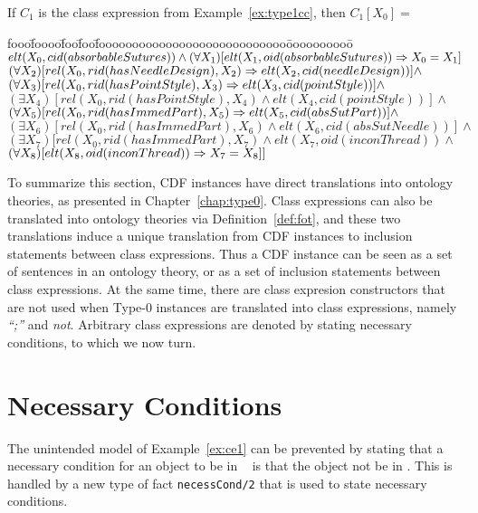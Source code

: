 \begin{example} \rm
If $C_1$ is the class expression from Example~\ref{ex:type1cc}, then
$C_1[X_0] = $
{\small
\begin{tabbing}
fooo\=foooo\=foo\=foo\=foooooooooooooooooooooooooooo\=oooooooooo\=\kill
\> $elt(X_0,cid(absorbableSutures)) \wedge (\forall X_1)
	[elt(X_1,oid(absorbableSutures)) \Rightarrow X_0 = X_1]$ \\
\> $(\forall X_2) [rel(X_0,rid(hasNeedleDesign),X_2) \Rightarrow
			elt(X_2,cid(needleDesign))] \wedge $ \\
\> $(\forall X_3) [rel(X_0,rid(hasPointStyle),X_3) \Rightarrow
			elt(X_3,cid(pointStyle))] \wedge $ \\
\> \> $(\exists X_4) [rel(X_0,rid(hasPointStyle),X_4) \wedge
			elt(X_4,cid(pointStyle))] \wedge $ \\
\> $(\forall X_5) [rel(X_0,rid(hasImmedPart),X_5) \Rightarrow
			elt(X_5,cid(absSutPart))] \wedge $ \\
\> \> $(\exists X_6) [rel(X_0,rid(hasImmedPart),X_6) \wedge
			elt(X_6,cid(absSutNeedle))] \wedge $ \\
\> \> $(\exists X_7) [rel(X_0,rid(hasImmedPart),X_7) \wedge
			elt(X_7,oid(inconThread)) \wedge $ \\
\> \> \> \> $	(\forall X_8) [elt(X_8,oid(inconThread)) \Rightarrow X_7 = X_8]] $
\end{tabbing}
}
\end{example}

To summarize this section, CDF instances have direct translations into
ontology theories, as presented in Chapter~\ref{chap:type0}.  Class
expressions can also be translated into ontology theories via
Definition~\ref{def:fot}, and these two translations induce a unique
translation from CDF instances to inclusion statements between class
expressions.  Thus a CDF instance can be seen as a set of sentences in
an ontology theory, or as a set of inclusion statements between class
expressions.  At the same time, there are class expresion constructors
that are not used when Type-0 instances are translated into class
expressions, namely {\em ``;''} and {\em not}.  Arbitrary class
expressions are denoted by stating necessary conditions, to which we
now turn.

\section{Necessary Conditions} 

The unintended model of Example~\ref{ex:ce1} can be prevented by
stating that a necessary condition for an object to be in {\tt
{}} is that the object not be in {\tt {}}.  This
is handled by a new type of fact {\tt necessCond/2} that is used to
state necessary conditions.

